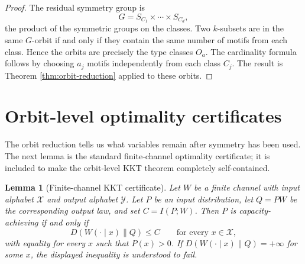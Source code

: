 \documentclass[11pt]{article}
\newtheorem{lemma}{Lemma}
\theoremstyle{definition}
\theoremstyle{remark}
\newcommand{\1}{\mathbf 1}
\begin{document}
\begin{proof}
The residual symmetry group is
\[
  G=S_{C_1}\times\cdots\times S_{C_d},
\]
the product of the symmetric groups on the classes.  Two \(k\)-subsets are in the same \(G\)-orbit if and only if they contain the same number of motifs from each class.  Hence the orbits are precisely the type classes \(O_a\).  The cardinality formula follows by choosing \(a_j\) motifs independently from each class \(C_j\).  The result is Theorem \ref{thm:orbit-reduction} applied to these orbits.
\end{proof}


\section{Orbit-level optimality certificates}

The orbit reduction tells us what variables remain after symmetry has been used.  The next lemma is the standard finite-channel optimality certificate; it is included to make the orbit-level KKT theorem completely self-contained.

\begin{lemma}[Finite-channel KKT certificate]\label{lem:finite-channel-kkt}
Let \(W\) be a finite channel with input alphabet \(\mathcal X\) and output alphabet \(\mathcal Y\).  Let \(P\) be an input distribution, let \(Q=PW\) be the corresponding output law, and set \(C=I(P;W)\).  Then \(P\) is capacity-achieving if and only if
\[
  D(W(\cdot\mid x)\|Q)\le C
  \qquad\text{for every }x\in\mathcal X,
\]
with equality for every \(x\) such that \(P(x)>0\).  If \(D(W(\cdot\mid x)\|Q)=+\infty\) for some \(x\), the displayed inequality is understood to fail.
\end{lemma}
\end{document}
